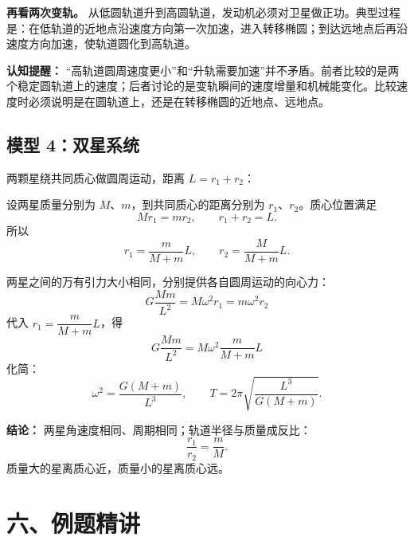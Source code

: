 \textbf{再看两次变轨。} 从低圆轨道升到高圆轨道，发动机必须对卫星做正功。典型过程是：在低轨道的近地点沿速度方向第一次加速，进入转移椭圆；到达远地点后再沿速度方向加速，使轨道圆化到高轨道。

\begin{center}


\label{fig:satellite-transfer-orbit}
\end{center}

\textbf{认知提醒：} “高轨道圆周速度更小”和“升轨需要加速”并不矛盾。前者比较的是两个稳定圆轨道上的速度；后者讨论的是变轨瞬间的速度增量和机械能变化。比较速度时必须说明是在圆轨道上，还是在转移椭圆的近地点、远地点。

\subsection*{模型 4：双星系统}

两颗星绕共同质心做圆周运动，距离 $L = r_1 + r_2$：

\begin{center}


\label{fig:binary-star}
\end{center}

设两星质量分别为 $M$、$m$，到共同质心的距离分别为 $r_1$、$r_2$。质心位置满足
\[
Mr_1=mr_2,\qquad r_1+r_2=L.
\]
所以
\[
r_1=\frac{m}{M+m}L,\qquad r_2=\frac{M}{M+m}L.
\]

两星之间的万有引力大小相同，分别提供各自圆周运动的向心力：
\[
G\frac{Mm}{L^2} = M\omega^2 r_1 = m\omega^2 r_2
\]
代入 $r_1=\dfrac{m}{M+m}L$，得
\[
G\frac{Mm}{L^2}=M\omega^2\frac{m}{M+m}L
\]
化简：
\[
\boxed{\omega^2=\frac{G(M+m)}{L^3}},\qquad
\boxed{T=2\pi\sqrt{\frac{L^3}{G(M+m)}}}.
\]

\textbf{结论：} 两星角速度相同、周期相同；轨道半径与质量成反比：
\[
\frac{r_1}{r_2}=\frac{m}{M}.
\]
质量大的星离质心近，质量小的星离质心远。

\section*{六、例题精讲}

